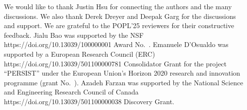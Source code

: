 \documentclass[acmsmall,nonacm,screen,appendix]{acmart}
\begin{document}
\begin{acks}
  We would like to thank Justin Hsu
  for connecting the authors and the many discussions.
  We also thank Derek Dreyer and Deepak Garg for the
  discussions and support.
  We are grateful to the POPL'25 reviewers for
  their constructive feedback.
  Jialu Bao was supported by the
    {NSF}
    {https://doi.org/10.13039/100000001}
  Award No.~.
  Emanuele D'Osualdo was supported by a
    {European Research Council (ERC)}
    {https://doi.org/10.13039/501100000781}
  Consolidator Grant for the project ``PERSIST'' under the European Union's Horizon 2020 research and innovation programme
  (grant No.~).
Azadeh Farzan was supported by the
    {National Science and Engineering Research Council of Canada}
    {https://doi.org/10.13039/501100000038}
  Discovery Grant.
\end{acks}


\label{paper-last-page}
\end{document}
